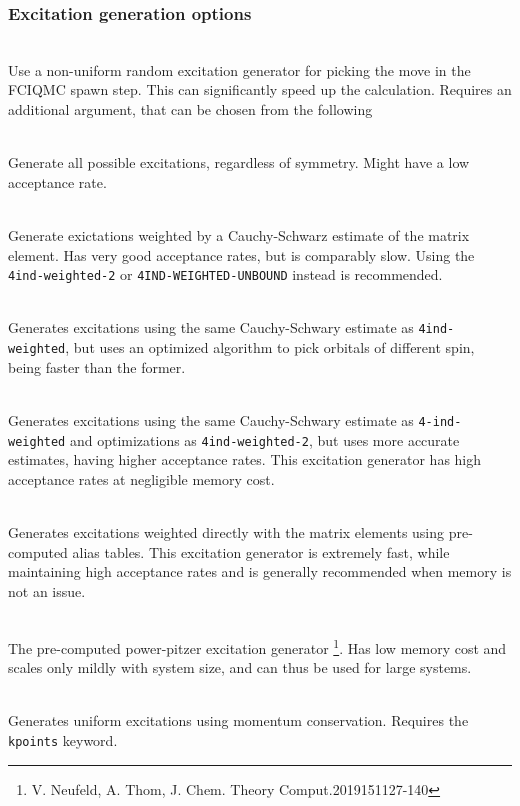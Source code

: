 \documentclass[a4paper,notitlepage]{scrreprt}
\newcommand\codeitem[1]{\needspace{1.5\baselineskip}\item[\textnormal{\ttfamily #1 \nopagebreak}] \hfill \\ \nopagebreak}
\begin{document}
\subsubsection{Excitation generation options}
\begin{description}
  \codeitem{nonuniformrandexcits}
  Use a non-uniform random excitation generator for picking the move in the
  FCIQMC spawn step. This can significantly speed up the calculation. Requires an additional
  argument, that can be chosen from the following
  \begin{description}
    \codeitem{nosymgen}
    Generate all possible excitations, regardless of symmetry. Might have a
    low acceptance rate.
    \codeitem{4ind-weighted}
    Generate exictations weighted by a Cauchy-Schwarz estimate of the matrix
    element. Has very good acceptance rates, but is comparably slow. Using the
    \texttt{4ind-weighted-2} or \texttt{4IND-WEIGHTED-UNBOUND} instead is recommended.
    \codeitem{4ind-weighted-2}
    Generates excitations using the same Cauchy-Schwary estimate as
    \texttt{4ind-weighted}, but uses an optimized algorithm to pick orbitals
    of different spin, being faster than the former.
    \codeitem{4ind-weighted-unbound}
    Generates excitations using the same Cauchy-Schwary estimate as
    \texttt{4-ind-weighted} and optimizations as \texttt{4ind-weighted-2}, but
    uses more accurate estimates, having higher acceptance rates. This
    excitation generator has high acceptance rates at negligible memory cost.
    \codeitem{pchb}
    Generates excitations weighted directly with the matrix elements using pre-computed
    alias tables. This excitation generator is extremely fast, while
    maintaining high acceptance rates and is generally recommended when
    memory is not an issue.
    \codeitem{pcpp}
    The pre-computed power-pitzer excitation generator \footnote{V. Neufeld,
      A. Thom, J. Chem. Theory Comput.2019151127-140}. Has low memory cost and
    scales only mildly with system size, and can thus be used for large systems.
  \end{description}
  \codeitem{lattice-excitgen}
  Generates uniform excitations using momentum conservation. Requires the
  \texttt{kpoints} keyword.
\end{description}
  
\end{document}
